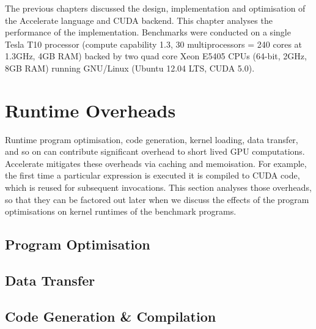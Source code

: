 The previous chapters discussed the design, implementation and optimisation of
the Accelerate language and CUDA backend. This chapter analyses the performance
of the implementation. Benchmarks were conducted on a single Tesla T10 processor
(compute capability 1.3, 30 multiprocessors = 240 cores at 1.3GHz, 4GB RAM)
backed by two quad core Xeon E5405 CPUs (64-bit, 2GHz, 8GB RAM) running
GNU/Linux (Ubuntu 12.04 LTS, CUDA 5.0).


\section{Runtime Overheads}

Runtime program optimisation, code generation, kernel loading, data transfer,
and so on can contribute significant overhead to short lived GPU computations.
Accelerate mitigates these overheads via caching and memoisation. For example,
the first time a particular expression is executed it is compiled to CUDA code,
which is reused for subsequent invocations. This section analyses those
overheads, so that they can be factored out later when we discuss the effects of
the program optimisations on kernel runtimes of the benchmark programs.


\subsection{Program Optimisation}


\subsection{Data Transfer}


\subsection{Code Generation \& Compilation}



